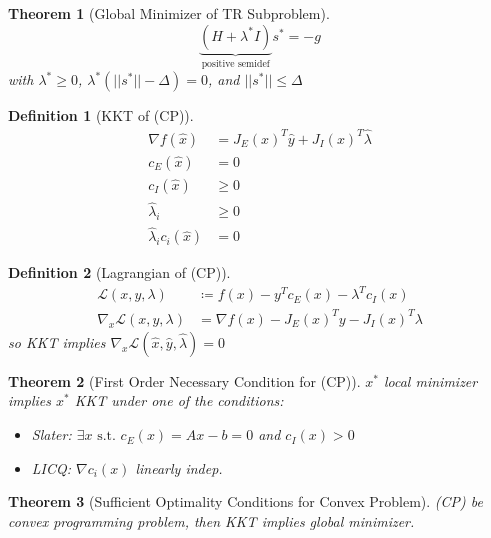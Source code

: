 \documentclass[a4paper]{article}
\newcommand{\Lagrangian}{\mathcal{L}}
\newcommand{\st}{\text{ s.t. }}
\newcommand{\norm}[1]{\lvert \lvert #1 \rvert \rvert}
\newtheorem{theorem}{Theorem}
\newtheorem*{definition*}{Definition}
\begin{document}
\begin{theorem}[Global Minimizer of TR Subproblem]
    \begin{equation*}
        \underbrace{\left( H + \lambda^* I \right)}_{\text{positive semidef}} s^{*} = -g
    \end{equation*}
    with $\lambda^* \geq 0$, $\lambda^* \left( \norm{s^*} - \Delta \right) = 0$, and $\norm{s^*} \leq \Delta$
\end{theorem}

\begin{definition*}[KKT of (CP)]
    \begin{align*}
        \nabla f \left( \hat x \right) &= J_E (x)^T \hat y + J_{I}(x)^T \hat \lambda \\
        c_E \left( \hat x \right) &= 0 \\
        c_I \left( \hat x \right) &\geq 0 \\
        \hat \lambda_i &\geq 0 \\
        \hat \lambda_i c_i \left( \hat x \right) &= 0
    \end{align*}
\end{definition*}

\begin{definition*}[Lagrangian of (CP)]
    \begin{align*}
        \Lagrangian \left( x, y, \lambda \right) &\coloneqq f(x) - y^T c_E (x) - \lambda^T c_I (x) \\
        \nabla_x \Lagrangian \left( x,y, \lambda \right) &= \nabla f(x) - J_E (x)^T y - J_I(x)^T \lambda
    \end{align*}
    so KKT implies $\nabla_{x} \Lagrangian \left( \hat x, \hat y, \hat \lambda \right) = 0$
\end{definition*}

\begin{theorem}[First Order Necessary Condition for (CP)]
    $x^*$ local minimizer implies $x^*$ KKT under one of the conditions:
    \begin{itemize}
        \item Slater: $\exists x \st c_E(x) = Ax - b = 0$ and $c_I(x) > 0$
        \item LICQ: $\nabla c_i (x)$ linearly indep.
    \end{itemize}
\end{theorem}

\begin{theorem}[Sufficient Optimality Conditions for Convex Problem]
    (CP) be convex programming problem, then KKT implies global minimizer.
\end{theorem}
\end{document}
